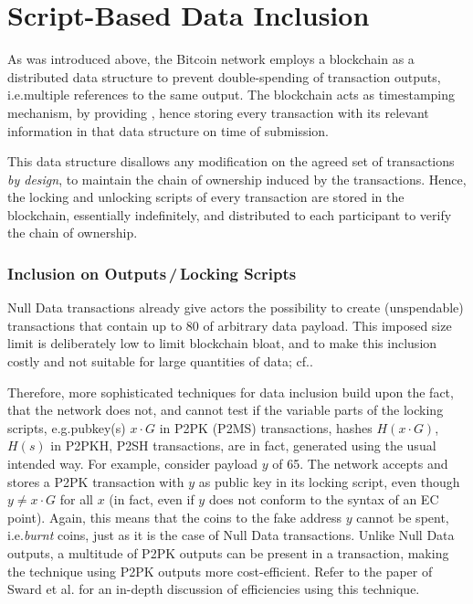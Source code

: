 \documentclass[a4paper,11pt,titlepage]{scrbook}
\begin{document}
\section{Script-Based Data Inclusion}\label{sec:fakekeys}

As was introduced above, the Bitcoin network employs a blockchain as a distributed data structure to prevent double-spending of transaction outputs, i.e.\@ multiple references to the same output.
The blockchain acts as timestamping mechanism, by providing , hence storing every transaction with its relevant information in that data structure on time of submission.

This data structure disallows any modification on the agreed set of transactions \emph{by design}, 
to maintain the chain of ownership induced by the transactions.
Hence, the locking and unlocking scripts of every transaction are stored in the blockchain, essentially indefinitely, and distributed to each participant to verify the chain of ownership.

\subsubsection*{Inclusion on Outputs\,/\,Locking Scripts}

Null Data transactions already give actors the possibility to create (unspendable) transactions that contain up to \SI{80}{\byte} of arbitrary data payload. This imposed size limit is deliberately low to limit blockchain bloat, and to make this inclusion costly and not suitable for large quantities of data; cf.\@ \cite[155--156]{antonopoulos_mastering_2017}.

Therefore, more sophisticated techniques for data inclusion build upon the fact, that the network does not, and cannot test if the variable parts of the locking scripts, e.g.\@ pubkey(s) $x\cdot G$ in P2PK (P2MS) transactions, hashes $H(x\cdot G)$, $H(s)$ in P2PKH, P2SH transactions, are in fact, generated using the usual intended way.
For example, consider payload $y$ of \SI{65}{\byte}.
The network accepts and stores a P2PK transaction with $y$ as  public key in its locking script, even though $y\neq x\cdot G$ for all $x$ (in fact, even if $y$ does not conform to the syntax of an EC point).
Again, this means that the coins  to the fake address $y$ cannot be spent, i.e.\@ \emph{burnt} coins, just as it is the case of Null Data transactions.
Unlike Null Data outputs, a multitude of P2PK outputs can be present in a transaction, making the technique using P2PK outputs more cost-efficient.
Refer to the paper of Sward et al.\@ \cite{sward_data_2018} for an in-depth discussion of efficiencies using this technique.
\end{document}
